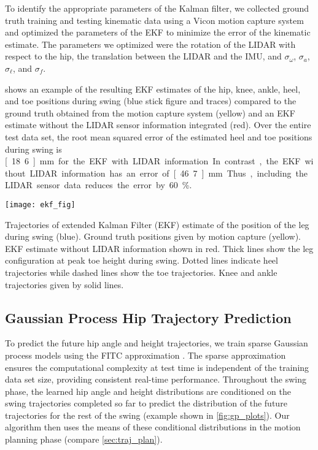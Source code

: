 To identify the appropriate parameters of the Kalman filter, we collected ground
truth training and testing kinematic data using a Vicon motion capture system
and optimized the parameters of the EKF to minimize the error of the kinematic
estimate. The parameters we optimized were the rotation of the LIDAR with
respect to the hip, the translation between the LIDAR and the IMU, and
$\sigma_\omega$, $\sigma_a$, $\sigma_\ell$, and $\sigma_f$. 

 shows an example of the resulting EKF estimates of the hip, knee,
ankle, heel, and toe positions during swing (blue stick figure and traces)
compared to the ground truth obtained from the motion capture system (yellow)
and an EKF estimate without the LIDAR sensor information integrated (red). Over
the entire test data set, the root mean squared error of the estimated heel and
toe positions during swing is \unit[18.6]{mm} for the EKF with LIDAR
information. In contrast, the EKF without LIDAR information has an error of
\unit[46.7]{mm}. Thus, including the LIDAR sensor data reduces the error by
60\%.
\begin{marginfigure}
    \centering
    \texttt{[image: ekf\_fig]}
    \caption[Trajectories of extended Kalman Filter (EKF) estimate of the
    position of the leg during swing compared to ground truth data from motion
    capture system]{Trajectories of extended Kalman Filter (EKF) estimate of the
    position of the leg during swing (blue). Ground truth positions given by
    motion capture (yellow). EKF estimate without LIDAR information shown in
    red. Thick lines show the leg configuration at peak toe height during swing.
    Dotted lines indicate heel trajectories while dashed lines show the toe
    trajectories. Knee and ankle trajectories given by solid
    lines.}\label{fig:ekf}
\end{marginfigure}

\subsection{Gaussian Process Hip Trajectory Prediction}\label{sec:predict_gp}

To predict the future hip angle and height trajectories, we train sparse
Gaussian process models using the FITC approximation \citep{snelson2007local}.
The sparse approximation ensures the computational complexity at test time is
independent of the training data set size, providing consistent real-time
performance. Throughout the swing phase, the learned hip angle and height
distributions are conditioned on the swing trajectories completed so far to
predict the distribution of the future trajectories for the rest of the swing
(example shown in \cref{fig:gp_plots}). Our algorithm then uses the means of
these conditional distributions in the motion planning phase
(compare \cref{sec:traj_plan}). 

